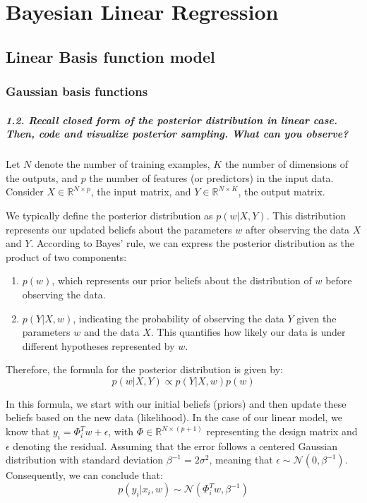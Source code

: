 \graphicspath{{figs/3a}}
\chapter{Bayesian Linear Regression}




\section{Linear Basis function model}
\subsection{Gaussian basis functions}
\paragraph*{1.2. Recall closed form of the posterior distribution in linear case. Then, code and visualize posterior sampling. What can you observe?}

Let $N$ denote the number of training examples, $K$ the number of dimensions of the outputs, and $p$ the number of features (or predictors) in the input data. Consider $X \in \mathbb{R}^{N \times p}$, the input matrix, and $Y \in \mathbb{R}^{N \times K}$, the output matrix. 

We typically define the posterior distribution as $ p(w | X, Y) $. This distribution represents our updated beliefs about the parameters $ w $ after observing the data $ X $ and $ Y $. According to Bayes' rule, we can express the posterior distribution as the product of two components:
\begin{enumerate}
    \item $ p(w) $, which represents our prior beliefs about the distribution of $ w $ before observing the data.
    \item $ p(Y | X, w) $, indicating the probability of observing the data $ Y $ given the parameters $ w $ and the data $ X $. This quantifies how likely our data is under different hypotheses represented by $ w $.
\end{enumerate}
Therefore, the formula for the posterior distribution is given by:
\[ p(w | X, Y) \propto p(Y | X, w) p(w) \]

In this formula, we start with our initial beliefs (priors) and then update these beliefs based on the new data (likelihood). In the case of our linear model, we know that $ y_i = \Phi^T_i w + \epsilon $, with $ \Phi \in \mathbb{R}^{N \times (p + 1)} $ representing the design matrix and $ \epsilon $ denoting the residual. Assuming that the error follows a centered Gaussian distribution with standard deviation $ \beta ^{-1} = 2\sigma^2 $, meaning that $ \epsilon \sim \mathcal{N}(0, \beta ^{-1}) $. Consequently, we can conclude that:
\[ p(y_i | x_i, w) \sim \mathcal{N}(\Phi^T_i w, \beta ^{-1}) \]

